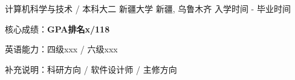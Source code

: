 \vspace{-8mm}
\vspace{-3mm}
\begin{cventries}
  \cventry
    {计算机科学与技术 / 本科大二} %
    {新疆大学} %
    {新疆, 乌鲁木齐} %
    {入学时间 - 毕业时间} %
    {
      \vspace{-4mm}
      \begin{cvitems}
        \item {核心成绩：\textbf{GPA排名x/118}} %
        \item {英语能力：四级xxx / 六级xxx} %
        \item {补充说明：科研方向 / 软件设计师 / 主修方向} %
      \end{cvitems}
    }
\end{cventries}
